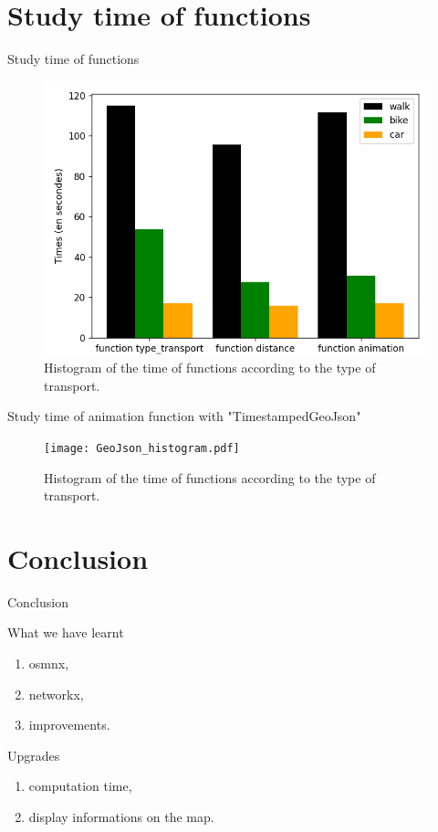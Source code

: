 \documentclass[11pt, compress]{beamer}
\theoremstyle{definition}
\begin{document}
\section[Times]{Study time of functions}
\begin{frame}{Study time of functions}
\begin{figure}[H]
    \centering
    \includegraphics[scale=.5]{histogram.png}
    \caption{Histogram of the time of functions according to the type of transport.}
    \label{fig:histogram}
\end{figure}
\end{frame}

\begin{frame}{Study time of animation function with "TimestampedGeoJson"}
\begin{figure}[H]
    \centering
    \texttt{[image: GeoJson\_histogram.pdf]}
    \caption{Histogram of the time of functions according to the type of transport.}
    \label{fig:histogram}
\end{figure}
\end{frame}

\section[Conclu]{Conclusion}
\begin{frame}{Conclusion}
\begin{block}{What we have learnt}
\begin{enumerate}[label=$\bullet$]
    \item osmnx,
    \item networkx,
    \item improvements.
\end{enumerate}
\end{block}

\begin{block}{Upgrades}
\begin{enumerate}[label=$\bullet$]
    \item computation time,
    \item display informations on the map. %
\end{enumerate}
\end{block}
\end{frame}
\end{document}
